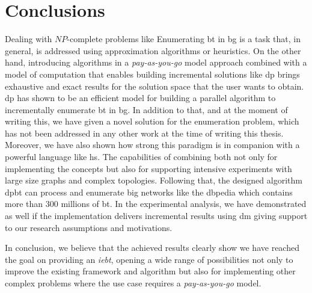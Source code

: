 \section{Conclusions}
Dealing with $NP$-complete problems like Enumerating \acrlong{bt} in \acrlong{bg} is a task that, in general, is addressed using approximation algorithms or heuristics. 
On the other hand, introducing algorithms in a \emph{pay-as-you-go} model approach combined with a model of computation that enables building incremental solutions like \acrshort{dp} brings exhaustive and exact results for the solution space that the user wants to obtain.    
\acrfull{dp} has shown to be an efficient model for building a parallel algorithm to incrementally enumerate \acrlong{bt} in \acrlong{bg}. 
In addition to that, and at the moment of writing this, we have given a novel solution for the enumeration problem, which has not been addressed in any other work at the time of writing this thesis.
Moreover, we have also shown how strong this paradigm is in companion with a powerful language like \acrfull{hs}. 
The capabilities of combining both not only for implementing the concepts but also for supporting intensive experiments with large size graphs and complex topologies. 
Following that, the designed algorithm \acrshort{dpbt} can process and enumerate big networks like the \acrlong{dbpedia} which contains more than $300$ millions of \acrlong{bt}.
In the experimental analysis, we have demonstrated as well if the implementation delivers incremental results using \acrlong{dm} giving support to our research assumptions and motivations. 

In conclusion, we believe that the achieved results clearly show we have reached the goal on providing an \emph{\acrlong{iebt}}, opening a wide range of possibilities not only to improve the existing framework and algorithm but also for implementing other complex problems where the use case requires a \emph{pay-as-you-go} model.
